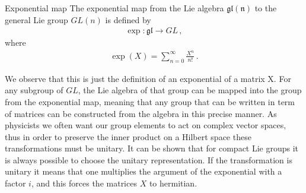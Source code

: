 \begin{mydef}{Exponential map}{}
The exponential map from the Lie algebra $\mathfrak{gl(n)}$ to the general Lie group $GL(n)$ is defined by
\begin{align}
    \exp:\mathfrak{gl}\rightarrow GL\,,
\end{align}
where
\begin{align}
    \exp(X)=\sum_{n=0}^{\infty}\frac{X^{n}}{n!}\,.
\end{align}
\end{mydef}\noindent
We observe that this is just the definition of an exponential of a matrix X. For any subgroup of $GL$, the Lie algebra of that group can be mapped into the group from the exponential map, meaning that any group that can be written in term of matrices can be constructed from the algebra in this precise manner. As physicists we often want our group elements to act on complex vector spaces, thus in order to preserve the inner product on a Hilbert space these transformations must be unitary. It can be shown that for compact Lie groups it is always possible to choose the unitary representation. If the transformation is unitary it means that one multiplies the argument of the exponential with a factor $i$, and this forces the matrices $X$ to hermitian.

